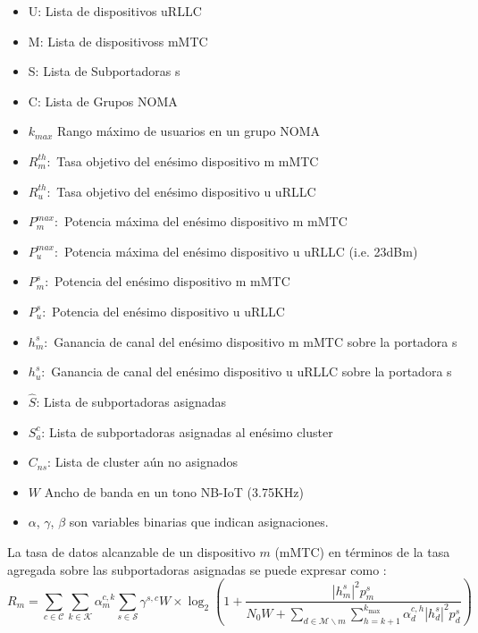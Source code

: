 \begin{itemize}
    \item U: Lista de dispositivos uRLLC
    \item M: Lista de dispositivoss mMTC
    \item S: Lista de Subportadoras s
    \item C: Lista de Grupos NOMA
    \item $k_{max}$ Rango máximo de usuarios en un grupo NOMA
    \item $R_{m}^{th}:$ Tasa objetivo del enésimo dispositivo m mMTC 
    \item $R_{u}^{th}:$ Tasa objetivo del enésimo dispositivo u uRLLC
    \item $P_{m}^{max}:$ Potencia máxima del enésimo dispositivo m mMTC 
    \item $P_{u}^{max}:$ Potencia máxima del enésimo dispositivo u uRLLC (i.e. 23dBm)
    \item $P_{m}^{s}:$ Potencia del enésimo dispositivo m mMTC 
    \item $P_{u}^{s}:$ Potencia del enésimo dispositivo u uRLLC 
    \item $h_{m}^{s}:$ Ganancia de canal del enésimo dispositivo m mMTC sobre la portadora s
    \item $h_{u}^{s}:$ Ganancia de canal del enésimo dispositivo u uRLLC sobre la portadora s
    \item ${\hat S}$: Lista de subportadoras asignadas
    \item $S_{a}^{c}$: Lista de subportadoras asignadas al enésimo cluster
    \item ${C_{ns}}$: Lista de cluster aún no asignados
    \item $W$ Ancho de banda en un tono NB-IoT (3.75KHz)
    \item $\alpha$, $\gamma$, $\beta$ son variables binarias que indican asignaciones.
\end{itemize}

La tasa de datos alcanzable de un dispositivo $m$ (mMTC) en términos de la tasa agregada sobre las subportadoras asignadas se puede expresar como \parencite{Shahini2019}:
\begin{equation}
{R_{m}}=\sum \limits _{c \in \mathcal {C}} {\sum \limits _{k \in \mathcal {K}} {\alpha _{m}^{c,k}\sum \limits _{s \in \mathcal {S}} {{\gamma ^{s,c}}W} } } \times {\log _{2}}\left ({{1 + \frac {{{{\left |{ {h_{m}^{s}} }\right |}^{2}}p_{m}^{s}}}{{N_{0}W + \sum \limits _{d \in \mathcal {M}\backslash m} {\sum \limits _{h = k + 1}^{{k_{\max }}} {\alpha _{d}^{c,h}{{\left |{ {h_{d}^{s}} }\right |}^{2}}p_{d}^{s}} } }}} }\right)
\label{eqn:Rm}
\end{equation}

